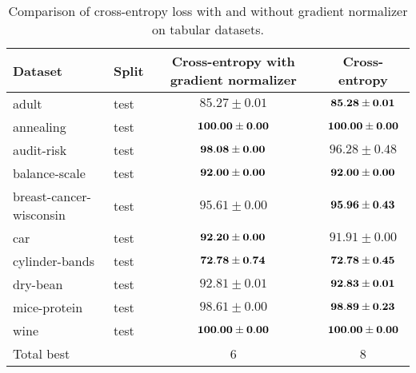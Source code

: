 \documentclass[nohyperref]{article}
\theoremstyle{plain}
\theoremstyle{definition}
\theoremstyle{remark}
\begin{document}
\begin{table*}[t]
\centering
\begin{tabular}{ll|cc}
Dataset & Split & Cross-entropy with gradient normalizer & Cross-entropy \\
\hline
adult                   & test & $85.27 \pm 0.01$ & $\bf 85.28 \pm 0.01$ \\
annealing               & test & $\bf 100.00 \pm 0.00$ & $\bf 100.00 \pm 0.00$ \\
audit-risk              & test & $\bf 98.08 \pm 0.00$ & $96.28 \pm 0.48$ \\
balance-scale           & test & $\bf 92.00 \pm 0.00$ & $\bf 92.00 \pm 0.00$ \\
breast-cancer-wisconsin & test & $95.61 \pm 0.00$ & $\bf 95.96 \pm 0.43$ \\
car                     & test & $\bf 92.20 \pm 0.00$ & $91.91 \pm 0.00$ \\
cylinder-bands          & test & $\bf 72.78 \pm 0.74$ & $\bf 72.78 \pm 0.45$ \\
dry-bean                & test & $92.81 \pm 0.01$ & $\bf 92.83 \pm 0.01$ \\
mice-protein            & test & $98.61 \pm 0.00$ & $\bf 98.89 \pm 0.23$ \\
wine                    & test & $\bf 100.00 \pm 0.00$ & $\bf 100.00 \pm 0.00$ \\
\hline
Total best & & 6 & 8 \\

\end{tabular}

\caption{Comparison of cross-entropy loss with and without gradient normalizer on tabular datasets.}
\label{tab:ablation-gnorm-xent}
\end{table*}
\end{document}
